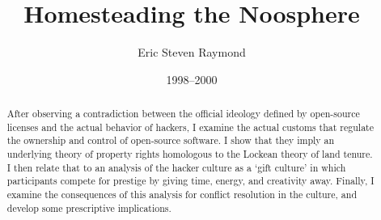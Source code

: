 \documentclass{article}
\title{Homesteading the Noosphere}
\author{Eric Steven Raymond}
\date{1998--2000}
\begin{document}
\maketitle

\begin{abstract}
  After observing a contradiction between the official ideology defined by
  open-source licenses and the actual behavior of hackers, I examine the actual
  customs that regulate the ownership and control of open-source software.  I
  show that they imply an underlying theory of property rights homologous to the
  Lockean theory of land tenure.  I then relate that to an analysis of the
  hacker culture as a `gift culture' in which participants compete for prestige
  by giving time, energy, and creativity away.  Finally, I examine the
  consequences of this analysis for conflict resolution in the culture, and
  develop some prescriptive implications.
\end{abstract}


























\end{document}
